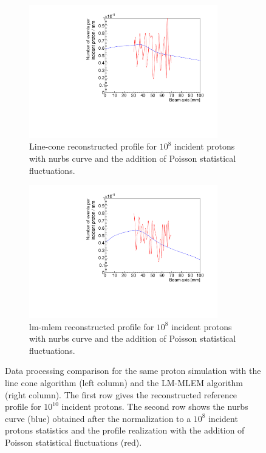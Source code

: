 \begin{figure}
\begin{subfigure}[t]{.49\textwidth}
 \includegraphics[width=0.9\textwidth]{03_GraphicFiles/chapter4_HTsimu/new/line_cone_refPoisson.pdf}
 \caption{Line-cone reconstructed profile for $10^8$ incident protons with \gls{nurbs} curve and the addition of Poisson statistical fluctuations.}
  \label{fig:fig_Estimation_Camera_CC_NURBS_Poisson_LC}
 \end{subfigure}
  \begin{subfigure}[t]{.49\textwidth}
  \includegraphics[width=0.9\textwidth]{03_GraphicFiles/chapter4_HTsimu/new/MLEM_refPoisson.pdf}
  \caption{\gls{lm-mlem} reconstructed profile for $10^8$ incident protons with \gls{nurbs} curve and the addition of Poisson statistical fluctuations.}
   \label{fig:fig_Estimation_Camera_CC_NURBS_Poisson_MLEM}
   \end{subfigure}
  \caption{Data processing comparison for the same proton simulation with the line cone algorithm (left column) and the LM-MLEM algorithm (right column). The first row gives the reconstructed reference profile for $10^{10}$ incident protons. The second row shows the \gls{nurbs} curve (blue) obtained after the normalization to a $10^8$ incident protons statistics and the profile realization with the addition of Poisson statistical fluctuations (red).}%
  \label{}
\end{figure}

